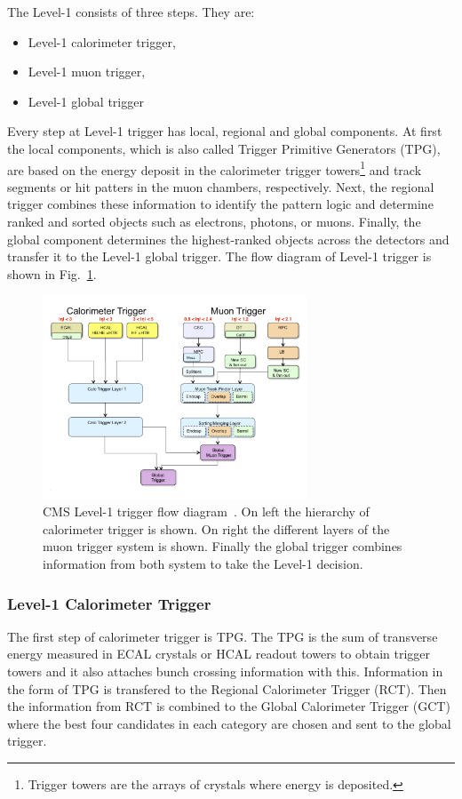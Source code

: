 {{{The Level-1 consists of three steps. They are:
\begin{itemize}
	\item Level-1 calorimeter trigger,
	\item Level-1 muon trigger,
	\item Level-1 global trigger
\end{itemize}
Every step at Level-1 trigger has local, regional and global components. At first the local components, which is also called Trigger Primitive Generators (TPG), are based on the energy deposit in the calorimeter trigger towers\footnote{Trigger towers are the arrays of crystals where energy is deposited.} and track segments or hit patters in the muon chambers, respectively. Next, the regional trigger combines these information to identify the pattern logic and determine ranked and sorted objects such as electrons, photons, or muons. Finally, the global component determines the highest-ranked objects across the detectors and transfer it to the Level-1 global trigger. The flow diagram of Level-1 trigger is shown in Fig.~\ref{fig:cms-L1-trigger}.
\begin{figure}[htbp]
	\centering
	\includegraphics[width=0.70\textwidth]{figures/LHC/TriggerBlockDiagram_Eta.jpg}
	\caption{CMS Level-1 trigger flow diagram~\cite{L1trigger-2013}. On left the hierarchy of calorimeter trigger is shown. On right the different layers of the muon trigger system is shown. Finally the global trigger combines information from both system to take the Level-1 decision.}
	\label{fig:cms-L1-trigger}
\end{figure}

\subsubsection{Level-1 Calorimeter Trigger} %
\label{ssub:l1_calorimeter_trigger}
The first step of calorimeter trigger is TPG. The TPG is the sum of transverse energy measured in ECAL crystals or HCAL readout towers to obtain trigger towers and it also attaches bunch crossing information with this. Information in the form of TPG is transfered to the Regional Calorimeter Trigger (RCT). Then the information from RCT is combined to the Global Calorimeter Trigger (GCT) where the best four candidates in each category are chosen and sent to the global trigger.

}}}
